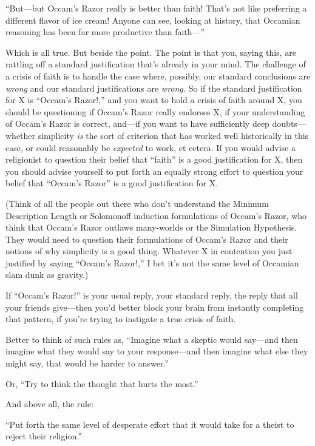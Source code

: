 {
 ``But---but Occam's Razor really
is better than faith! That's not like preferring a
different flavor of ice cream! Anyone can see, looking at history, that
Occamian reasoning has been far more productive than
faith---''}

{
 Which is all true. But beside the point. The point is that you,
saying this, are rattling off a standard justification
that's already in your mind. The challenge of a crisis
of faith is to handle the case where, possibly, our standard
conclusions are \textit{wrong} and our standard justifications are
\textit{wrong.} So if the standard justification for X is
``Occam's Razor!,''
and you want to hold a crisis of faith around X, you should be
questioning if Occam's Razor really endorses X, if your
understanding of Occam's Razor is correct, and---if you
want to have sufficiently deep doubts---whether simplicity \textit{is}
the sort of criterion that has worked well historically in this case,
or could reasonably be \textit{expected} to work, et cetera. If you
would advise a religionist to question their belief that
``faith'' is a good justification
for X, then you should advise yourself to put forth an equally strong
effort to question your belief that
``Occam's Razor'' is
a good justification for X.}

{
 (Think of all the people out there who don't
understand the Minimum Description Length or Solomonoff induction
formulations of Occam's Razor, who think that
Occam's Razor outlaws many-worlds or the Simulation
Hypothesis. They would need to question their formulations of
Occam's Razor and their notions of why simplicity is a
good thing. Whatever X in contention you just justified by saying
``Occam's Razor!,''
I bet it's not the same level of Occamian slam dunk as
gravity.)}

{
 If ``Occam's
Razor!'' is your usual reply, your standard reply,
the reply that all your friends give---then you'd
better block your brain from instantly completing that pattern, if
you're trying to instigate a true crisis of faith.}

{
 Better to think of such rules as, ``Imagine what
a skeptic would say---and then imagine what they would say to your
response---and then imagine what else they might say, that would be
harder to answer.''}

{
 Or, ``Try to think the thought that hurts the
most.''}

{
 And above all, the rule:}

{
 ``Put forth the same level of desperate effort
that it would take for a theist to reject their
religion.''}

